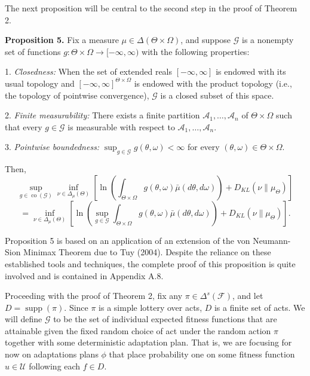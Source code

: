\documentclass[12pt,a4paper]{article}
\newenvironment{original}
  {\par\noindent\color{black}\smallskip}
  {\par\smallskip}
\begin{document}
\begin{original}
The next proposition will be central to the second step in the proof of Theorem 2.

\textbf{Proposition 5.} Fix a measure $\mu \in \Delta(\Theta \times \Omega)$, and suppose $\mathcal{G}$ is a nonempty set of functions $g: \Theta \times \Omega \to [-\infty, \infty)$ with the following properties:

1. \textit{Closedness:} When the set of extended reals $[-\infty, \infty]$ is endowed with its usual topology and $[-\infty, \infty]^{\Theta \times \Omega}$ is endowed with the product topology (i.e., the topology of pointwise convergence), $\mathcal{G}$ is a closed subset of this space.

2. \textit{Finite measurability:} There exists a finite partition $\mathcal{A}_1, \dots, \mathcal{A}_n$ of $\Theta \times \Omega$ such that every $g \in \mathcal{G}$ is measurable with respect to $\mathcal{A}_1, \dots, \mathcal{A}_n$.

3. \textit{Pointwise boundedness:} $\sup_{g \in \mathcal{G}} g(\theta, \omega) < \infty$ for every $(\theta, \omega) \in \Theta \times \Omega$.

Then,
\[
\sup_{g \in \operatorname{co}(\mathcal{G})} \inf_{\nu \in \Delta_\mu(\Theta)} \left[ \ln\left( \int_{\Theta \times \Omega} g(\theta, \omega) \bar{\mu}(d\theta, d\omega) \right) + D_{KL}(\nu\|\mu_\Theta) \right]
\]
\[
= \inf_{\nu \in \Delta_\mu(\Theta)} \left[ \ln\left( \sup_{g \in \mathcal{G}} \int_{\Theta \times \Omega} g(\theta, \omega) \bar{\mu}(d\theta, d\omega) \right) + D_{KL}(\nu\|\mu_\Theta) \right].
\]

Proposition 5 is based on an application of an extension of the von Neumann-Sion Minimax Theorem due to Tuy (2004). Despite the reliance on these established tools and techniques, the complete proof of this proposition is quite involved and is contained in Appendix A.8.

Proceeding with the proof of Theorem 2, fix any $\pi \in \Delta^s(\mathcal{F})$, and let $D = \operatorname{supp}(\pi)$. Since $\pi$ is a simple lottery over acts, $D$ is a finite set of acts. We will define $\mathcal{G}$ to be the set of individual expected fitness functions that are attainable given the fixed random choice of act under the random action $\pi$ together with some deterministic adaptation plan. That is, we are focusing for now on adaptations plans $\phi$ that place probability one on some fitness function $u \in \mathcal{U}$ following each $f \in D$.


\end{original}
\end{document}
